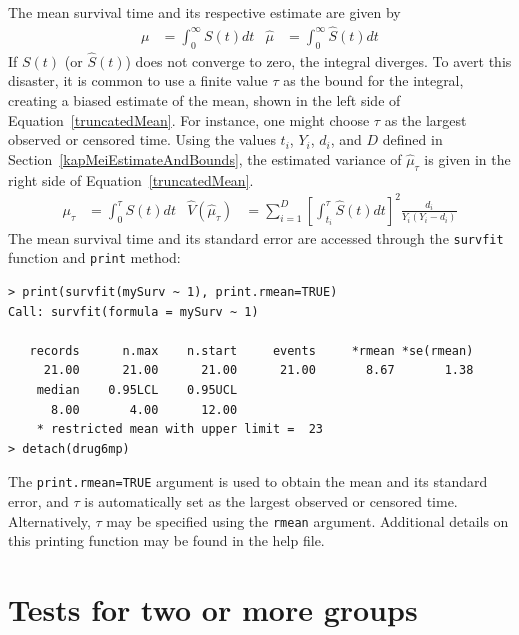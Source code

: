 \documentclass[article]{jss}
\begin{document}
\noindent The mean survival time and its respective estimate are given by
\begin{align*}
\mu &= \int_0^\infty S(t)dt
	&\hat{\mu} &= \int_0^\infty \hat{S}(t)dt
\end{align*}
If $S(t)$ (or $\hat{S}(t)$) does not converge to zero, the integral diverges. To avert this disaster, it is common to use a finite value $\tau$ as the bound for the integral, creating a biased estimate of the mean, shown in the left side of Equation~\eqref{truncatedMean}. For instance, one might choose $\tau$ as the largest observed or censored time. Using the values $t_i$, $Y_i$, $d_i$, and $D$ defined in Section~\ref{kapMeiEstimateAndBounds}, the estimated variance of $\hat{\mu}_\tau$ is given in the right side of Equation~\eqref{truncatedMean}.
\begin{align} \label{truncatedMean}
\mu_\tau &= \int_0^\tau S(t)dt 
&\hat{V}(\hat{\mu}_\tau) &= \sum_{i=1}^D\left[\int_{t_i}^\tau \hat{S}(t)dt\right]^2 \frac{d_i}{Y_i(Y_i-d_i)}
\end{align}
The mean survival time and its standard error are accessed through the \texttt{survfit} function and \texttt{print} method:
\begin{verbatim}
> print(survfit(mySurv ~ 1), print.rmean=TRUE)
Call: survfit(formula = mySurv ~ 1)

   records      n.max    n.start     events     *rmean *se(rmean) 
     21.00      21.00      21.00      21.00       8.67       1.38 
    median    0.95LCL    0.95UCL 
      8.00       4.00      12.00 
    * restricted mean with upper limit =  23 
> detach(drug6mp)
\end{verbatim}
The \texttt{print.rmean=TRUE} argument is used to obtain the mean and its standard error, and $\tau$ is automatically set as the largest observed or censored time. Alternatively, $\tau$ may be specified using the \texttt{rmean} argument. Additional details on this printing function may be found in the  help file.

\pagebreak

\section[Tests for two or more groups]{Tests for two or more groups}
\label{testsForTwoOrMoreSamples}
\end{document}
